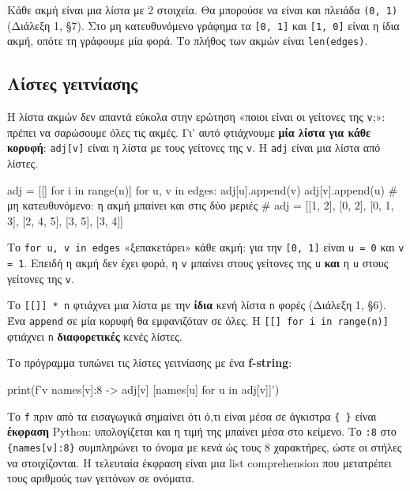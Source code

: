 \documentclass[11pt,a4paper]{article}
\newcommand{\code}[1]{\texttt{#1}}
\renewcommand{\_}{\textunderscore\allowbreak}
\begin{document}
Κάθε ακμή είναι μια λίστα με 2 στοιχεία. Θα μπορούσε να είναι και πλειάδα \code{(0, 1)} (Διάλεξη 1,
§7). Στο μη κατευθυνόμενο γράφημα τα \code{[0, 1]} και \code{[1, 0]} είναι η ίδια ακμή, οπότε τη
γράφουμε μία φορά. Το πλήθος των ακμών είναι \code{len(edges)}.

\subsection{Λίστες γειτνίασης}
Η λίστα ακμών δεν απαντά εύκολα στην ερώτηση «ποιοι είναι οι γείτονες της \code{v};»: πρέπει να
σαρώσουμε όλες τις ακμές. Γι' αυτό φτιάχνουμε \textbf{μία λίστα για κάθε κορυφή}: \code{adj[v]} είναι
η λίστα με τους γείτονες της \code{v}. Η \code{adj} είναι μια λίστα από λίστες.

\begin{Piton}
adj = [[] for i in range(n)]
for u, v in edges:
    adj[u].append(v)
    adj[v].append(u)        # μη κατευθυνόμενο: η ακμή μπαίνει και στις δύο μεριές
# adj = [[1, 2], [0, 2], [0, 1, 3], [2, 4, 5], [3, 5], [3, 4]]
\end{Piton}

Το \code{for u, v in edges} «ξεπακετάρει» κάθε ακμή: για την \code{[0, 1]} είναι \code{u = 0} και
\code{v = 1}. Επειδή η ακμή δεν έχει φορά, η \code{v} μπαίνει στους γείτονες της \code{u}
\textbf{και} η \code{u} στους γείτονες της \code{v}.

\begin{note}
Το \code{[[]] * n} φτιάχνει μια λίστα με την \textbf{ίδια} κενή λίστα \code{n} φορές (Διάλεξη 1,
§6). Ένα \code{append} σε μία κορυφή θα εμφανιζόταν σε όλες. Η \code{[[] for i in range(n)]}
φτιάχνει \code{n} \textbf{διαφορετικές} κενές λίστες.
\end{note}

\begin{note}[f-strings]
Το πρόγραμμα τυπώνει τις λίστες γειτνίασης με ένα \textbf{f-string}:
\begin{Piton}
print(f'{v} {names[v]:8} -> {adj[v]}   {[names[u] for u in adj[v]]}')
\end{Piton}
Το \code{f} πριν από τα εισαγωγικά σημαίνει ότι ό,τι είναι μέσα σε άγκιστρα \code{\{ \}} είναι
\textbf{έκφραση} Python: υπολογίζεται και η τιμή της μπαίνει μέσα στο κείμενο. Το \code{:8} στο
\code{\{names[v]:8\}} συμπληρώνει το όνομα με κενά ώς τους 8 χαρακτήρες, ώστε οι στήλες να
στοιχίζονται. Η τελευταία έκφραση είναι μια list comprehension που μετατρέπει τους αριθμούς των
γειτόνων σε ονόματα.
\end{note}
\end{document}

